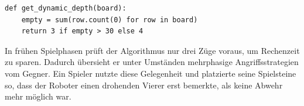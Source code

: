 \begin{lstlisting}[style=pythonstyle]
	def get_dynamic_depth(board):
	empty = sum(row.count(0) for row in board)
	return 3 if empty > 30 else 4
\end{lstlisting}

In frühen Spielphasen prüft der Algorithmus nur drei Züge voraus, um Rechenzeit zu sparen. Dadurch übersieht er unter Umständen mehrphasige Angriffsstrategien vom Gegner. Ein Spieler nutzte diese Gelegenheit und platzierte seine Spielsteine so, dass der Roboter einen drohenden Vierer erst bemerkte, als keine Abwehr mehr möglich war.





